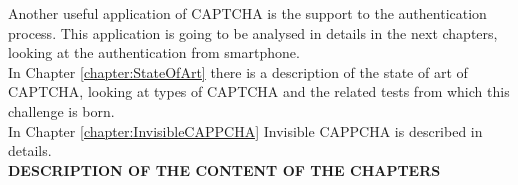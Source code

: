 Another useful application of CAPTCHA is the support to the authentication process. This application is going to be analysed in details in the next chapters, looking at the authentication from smartphone.\\
In Chapter \ref{chapter:StateOfArt} there is a description of the state of art of CAPTCHA, looking at types of CAPTCHA and the related tests from which this challenge is born.\\
In Chapter \ref{chapter:InvisibleCAPPCHA} Invisible CAPPCHA is described in details.\\
\textbf{DESCRIPTION OF THE CONTENT OF THE CHAPTERS}